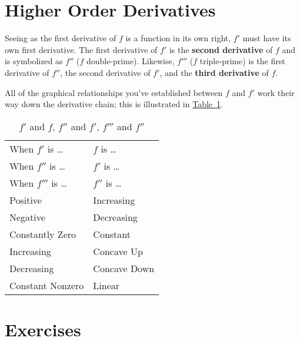 \documentclass[12pt,]{book}
\newcommand{\terminology}[1]{\textbf{#1}}
\theoremstyle{plain}
\theoremstyle{definition}
\numberwithin{equation}{section}
\newcommand{\hrulemedium}{\noalign{\hrule height 0.07em}}
\newcommand{\hrulethick} {\noalign{\hrule height 0.11em}}
\newcommand{\fd}[1]{#1'}
\newcommand{\sd}[1]{#1''}
\newcommand{\td}[1]{#1'''}
\begin{document}
\section[Higher Order Derivatives]{Higher Order Derivatives}\label{section-higher-order-derivatives}
Seeing as the first derivative of \(f\) is a function in its own right, \(\fd{f}\) must have its own first derivative.  The first derivative of \(\fd{f}\) is the \terminology{second derivative} of \(f\) and is symbolized as \(\sd{f}\) (\(f\) double-prime).  Likewise, \(\td{f}\) (\(f\) triple-prime) is the first derivative of \(\sd{f}\), the second derivative of \(\fd{f}\), and the \terminology{third derivative} of \(f\).%
\par
All of the graphical relationships you’ve established between \(f\) and \(\fd{f}\) work their way down the derivative chain; this is illustrated in \hyperref[table-f-prime-and-f]{Table~\ref*{table-f-prime-and-f}}.%
\begin{table}
\centering
\caption{\(\fd{f}\) and \(f\), \(\sd{f}\) and \(\fd{f}\), \(\td{f}\) and \(\sd{f}\)\label{table-f-prime-and-f}}
\begin{tabular}{ll}\hrulethick
When \(\fd{f}\) is \dots{}&\(f\) is \dots{}\\
When \(\sd{f}\) is \dots{}&\(\fd{f}\) is \dots{}\\
When \(\td{f}\) is \dots{}&\(\sd{f}\) is \dots{}\\\hrulemedium
Positive&Increasing\\
Negative&Decreasing\\
Constantly Zero&Constant\\
Increasing&Concave Up\\
Decreasing&Concave Down\\
Constant Nonzero&Linear
\end{tabular}
\end{table}
\typeout{************************************************}
\typeout{************************************************}
\section*{Exercises}\label{exercises-24}
\end{document}
